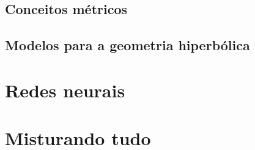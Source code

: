 \documentclass{article}
\begin{document}
\subsection{Conceitos métricos}

\subsection{Modelos para a geometria hiperbólica}

\section{Redes neurais}

\section{Misturando tudo}

\nocite{*}
\printbibliography
\end{document}

